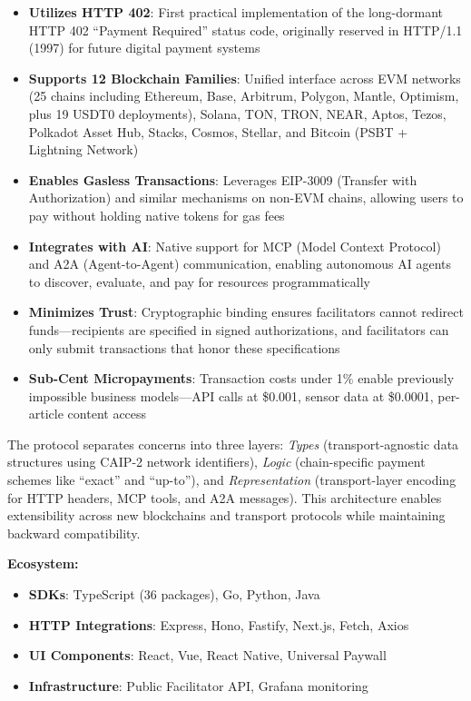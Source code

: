 \begin{itemize}
    \item \textbf{Utilizes HTTP 402}: First practical implementation of the long-dormant HTTP 402 ``Payment Required'' status code, originally reserved in HTTP/1.1 (1997) for future digital payment systems

    \item \textbf{Supports 12 Blockchain Families}: Unified interface across EVM networks (25 chains including Ethereum, Base, Arbitrum, Polygon, Mantle, Optimism, plus 19 USDT0 deployments), Solana, TON, TRON, NEAR, Aptos, Tezos, Polkadot Asset Hub, Stacks, Cosmos, Stellar, and Bitcoin (PSBT + Lightning Network)

    \item \textbf{Enables Gasless Transactions}: Leverages EIP-3009 (Transfer with Authorization) and similar mechanisms on non-EVM chains, allowing users to pay without holding native tokens for gas fees

    \item \textbf{Integrates with AI}: Native support for MCP (Model Context Protocol) and A2A (Agent-to-Agent) communication, enabling autonomous AI agents to discover, evaluate, and pay for resources programmatically

    \item \textbf{Minimizes Trust}: Cryptographic binding ensures facilitators cannot redirect funds---recipients are specified in signed authorizations, and facilitators can only submit transactions that honor these specifications

    \item \textbf{Sub-Cent Micropayments}: Transaction costs under 1\% enable previously impossible business models---API calls at \$0.001, sensor data at \$0.0001, per-article content access
\end{itemize}

The protocol separates concerns into three layers: \emph{Types} (transport-agnostic data structures using CAIP-2 network identifiers), \emph{Logic} (chain-specific payment schemes like ``exact'' and ``up-to''), and \emph{Representation} (transport-layer encoding for HTTP headers, MCP tools, and A2A messages). This architecture enables extensibility across new blockchains and transport protocols while maintaining backward compatibility.

\vspace{0.5em}

\noindent\textbf{Ecosystem:}
\begin{itemize}
    \item \textbf{SDKs}: TypeScript (36 packages), Go, Python, Java
    \item \textbf{HTTP Integrations}: Express, Hono, Fastify, Next.js, Fetch, Axios
    \item \textbf{UI Components}: React, Vue, React Native, Universal Paywall
    \item \textbf{Infrastructure}: Public Facilitator API, Grafana monitoring
\end{itemize}


